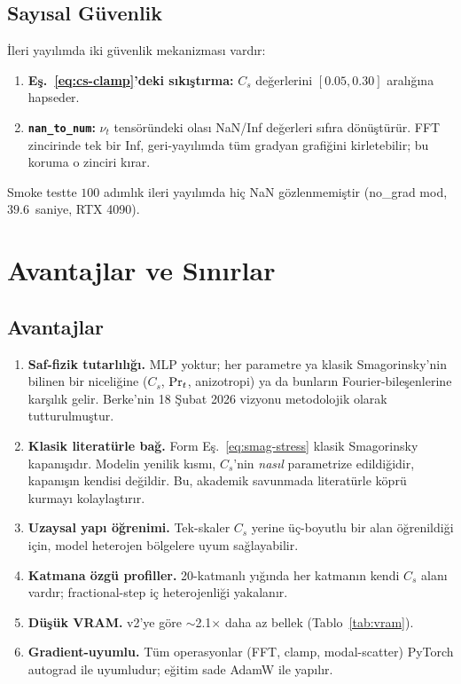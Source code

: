 \subsection{Sayısal Güvenlik}

İleri yayılımda iki güvenlik mekanizması vardır:

\begin{enumerate}
  \item \textbf{Eş.~\eqref{eq:cs-clamp}'deki sıkıştırma:} $C_s$
        değerlerini $[0.05, 0.30]$ aralığına hapseder.
  \item \textbf{\texttt{nan\_to\_num}:} $\nu_t$ tensöründeki olası
        NaN/Inf değerleri sıfıra dönüştürür. FFT zincirinde tek bir
        Inf, geri-yayılımda tüm gradyan grafiğini kirletebilir; bu
        koruma o zinciri kırar.
\end{enumerate}

Smoke testte $100$ adımlık ileri yayılımda hiç NaN gözlenmemiştir
(no\_grad mod, $39.6$~saniye, RTX 4090).

\section{Avantajlar ve Sınırlar}
\label{sec:adv-and-limits}

\subsection{Avantajlar}

\begin{enumerate}
  \item \textbf{Saf-fizik tutarlılığı.} MLP yoktur; her parametre ya
        klasik Smagorinsky'nin bilinen bir niceliğine ($C_s$, $\mathrm{Pr}_t$,
        anizotropi) ya da bunların Fourier-bileşenlerine karşılık gelir.
        Berke'nin 18 Şubat 2026 vizyonu metodolojik olarak tutturulmuştur.
  \item \textbf{Klasik literatürle bağ.} Form Eş.~\eqref{eq:smag-stress}
        klasik Smagorinsky kapanışıdır. Modelin yenilik kısmı, $C_s$'nin
        \emph{nasıl} parametrize edildiğidir, kapanışın kendisi değildir.
        Bu, akademik savunmada literatürle köprü kurmayı kolaylaştırır.
  \item \textbf{Uzaysal yapı öğrenimi.} Tek-skaler $C_s$ yerine üç-boyutlu
        bir alan öğrenildiği için, model heterojen bölgelere uyum
        sağlayabilir.
  \item \textbf{Katmana özgü profiller.} 20-katmanlı yığında her
        katmanın kendi $C_s$ alanı vardır; fractional-step iç
        heterojenliği yakalanır.
  \item \textbf{Düşük VRAM.} v2'ye göre $\sim$2.1$\times$ daha az bellek
        (Tablo~\ref{tab:vram}).
  \item \textbf{Gradient-uyumlu.} Tüm operasyonlar (FFT, clamp,
        modal-scatter) PyTorch autograd ile uyumludur; eğitim sade
        AdamW ile yapılır.
\end{enumerate}

